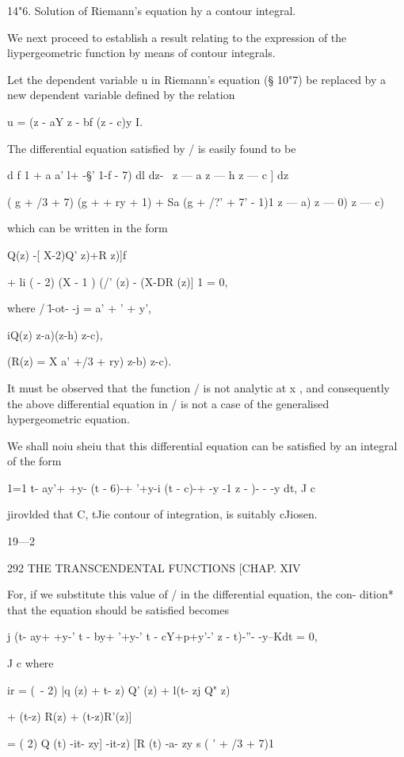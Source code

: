 14"6. Solution of Riemann's equation hy a contour integral.

We next proceed to establish a result relating to the expression of
the liypergeometric function by means of contour integrals.

Let the dependent variable u in Riemann's equation (§ 10"7) be
replaced by a new dependent variable defined by the relation

u = (z - aY z - bf (z - c)y I.

The differential equation satisfied by / is easily found to be

d f 1 + a a' l+ -§' 1-f - 7) dl dz- \ z — a z — h z — c ] dz

( g + /3 + 7) (g + + ry + 1) + Sa (g + /?' + 7' - 1)1 z — a) z — 0) z
— c)

which can be written in the form

Q(z) -[ X-2)Q' z)+R z)]f

+ li ( - 2) (X - 1 ) (/' (z) - (X-DR (z)] 1 = 0,

where / \=l-ot- -j = a' + ' + y',

iQ(z) z-a)(z-h) z-c),

(R(z) = X a' +/3 + ry) z-b) z-c).

It must be observed that the function / is not analytic at x , and
consequently the above differential equation in / is not a case of the
generalised hypergeometric equation.

We shall noiu sheiu that this differential equation can be satisfied
by an integral of the form

1=1 t- ay'+ +y- (t - 6)-+ '+y-i (t - c)-+ -y -1 z - )- - -y dt, J c

jirovlded that C, tJie contour of integration, is suitably cJiosen.

19—2



292 THE TRANSCENDENTAL FUNCTIONS [CHAP. XIV

For, if we substitute this value of / in the differential equation,
the con- dition* that the equation should be satisfied becomes

j (t- ay+ +y-' t - by+ '+y-' t - cY+p+y'-' z - t)-''- -y--Kdt = 0,

J c where

ir = (\ - 2) |q (z) + t- z) Q' (z) + l(t- zj Q" z)



+ (t-z) R(z) + (t-z)R'(z)]

= ( 2) Q (t) -it- zy] -it-z) [R (t) -a- zy s ( ' + /3 + 7)1

